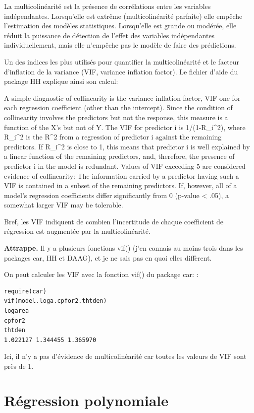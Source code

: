 \documentclass[12pt,]{book}
\begin{document}
La multicolinéarité est la présence de corrélations entre les variables indépendantes. Lorsqu'elle est extrême (multicolinéarité parfaite) elle empêche l'estimation des modèles statistiques. Lorsqu'elle est grande ou modérée, elle réduit la puissance de détection de l'effet des variables indépendantes individuellement, mais elle n'empêche pas le modèle de faire des prédictions.

Un des indices les plus utilisés pour quantifier la multicolinéarité et le facteur d'inflation de la variance (VIF, variance inflation factor). Le fichier d'aide du package HH explique ainsi son calcul:

A simple diagnostic of collinearity is the variance inflation factor, VIF one for each regression coefficient (other than the intercept). Since the condition of collinearity involves the predictors but not the response, this measure is a function of the X's but not of Y. The VIF for predictor i is 1/(1-R\_i\^{}2), where R\_i\^{}2 is the R\^{}2 from a regression of predictor i against the remaining predictors. If R\_i\^{}2 is close to 1, this means that predictor i is well explained by a linear function of the remaining predictors, and, therefore, the presence of predictor i in the model is redundant. Values of VIF exceeding 5 are considered evidence of collinearity: The information carried by a predictor having such a VIF is contained in a subset of the remaining predictors. If, however, all of a model's regression coefficients differ significantly from 0 (p-value \textless{} .05), a somewhat larger VIF may be tolerable.

Bref, les VIF indiquent de combien l'incertitude de chaque coefficient de régression est augmentée par la multicolinéarité.

\textbf{Attrappe.} Il y a plusieurs fonctions vif() (j'en connais au moins trois dans les packages car, HH et DAAG), et je ne sais pas en quoi elles diffèrent.

On peut calculer les VIF avec la fonction vif() du package car: :

\begin{verbatim}
require(car)
vif(model.loga.cpfor2.thtden)
logarea
cpfor2
thtden
1.022127 1.344455 1.365970
\end{verbatim}

Ici, il n'y a pas d'évidence de multicolinéarité car toutes les valeurs de VIF sont près de 1.

\hypertarget{ruxe9gression-polynomiale}{%
\section{Régression polynomiale}\label{ruxe9gression-polynomiale}}
\end{document}
